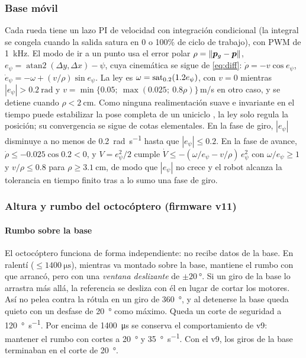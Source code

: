 \subsubsection{Base móvil}
\label{sec:basecontrol}
Cada rueda tiene un lazo PI de velocidad con integración condicional (la integral se congela cuando la salida satura en 0 o 100\% de ciclo de trabajo), con PWM de \SI{1}{\kilo\hertz}. El modo de ir a un punto usa el error polar $\rho=\|\bm{p}_g-\bm{p}\|$, $e_\psi=\operatorname{atan2}(\Delta y,\Delta x)-\psi$, cuya cinemática se sigue de \eqref{eq:diff}: $\dot\rho=-v\cos e_\psi$, $\dot e_\psi=-\omega+(v/\rho)\sin e_\psi$. La ley es $\omega=\operatorname{sat}_{0.2}(1.2e_\psi)$, con $v=0$ mientras $|e_\psi|>\SI{0.2}{\radian}$ y $v=\min\{0.05;\ \max(0.025;\ 0.8\rho)\}$\,m/s en otro caso, y se detiene cuando $\rho<\SI{2}{\centi\metre}$. Como ninguna realimentación suave e invariante en el tiempo puede estabilizar la pose completa de un uniciclo \cite{brockett1983}, la ley solo regula la posición; su convergencia se sigue de cotas elementales. En la fase de giro, $|e_\psi|$ disminuye a no menos de \SI{0.2}{\radian\per\second} hasta que $|e_\psi|\le0.2$. En la fase de avance, $\dot\rho\le-0.025\cos0.2<0$, y $V=e_\psi^2/2$ cumple $\dot V\le-(\omega/e_\psi-v/\rho)\,e_\psi^2$ con $\omega/e_\psi\ge1$ y $v/\rho\le0.8$ para $\rho\ge\SI{3.1}{\centi\metre}$, de modo que $|e_\psi|$ no crece y el robot alcanza la tolerancia en tiempo finito tras a lo sumo una fase de giro.

\subsubsection{Altura y rumbo del octocóptero (firmware v11)}
\label{sec:altura}
\paragraph{Rumbo sobre la base} El octocóptero funciona de forma independiente: no recibe datos de la base. En ralentí ($\le\SI{1400}{\micro\second}$), mientras va montado sobre la base, mantiene el rumbo con que arrancó, pero con una \emph{ventana deslizante} de $\pm\SI{20}{\degree}$. Si un giro de la base lo arrastra más allá, la referencia se desliza con él en lugar de cortar los motores. Así no pelea contra la rótula en un giro de \SI{360}{\degree}, y al detenerse la base queda quieto con un desfase de \SI{20}{\degree} como máximo. Queda un corte de seguridad a \SI{120}{\degree\per\second}. Por encima de \SI{1400}{\micro\second} se conserva el comportamiento de v9: mantener el rumbo con cortes a \SI{20}{\degree} y \SI{35}{\degree\per\second}. Con el v9, los giros de la base terminaban en el corte de \SI{20}{\degree}.

